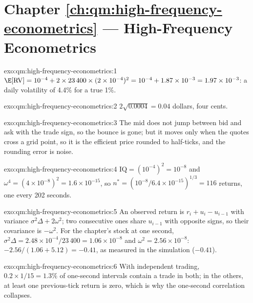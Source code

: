 \section*{Chapter \ref{ch:qm:high-frequency-econometrics} --- High-Frequency Econometrics}

\begin{solution}{exo:qm:high-frequency-econometrics:1}
$\E[\mathrm{RV}] = 10^{-4} + 2 \times 23\,400 \times (2 \times 10^{-4})^2 = 10^{-4} + 1.87 \times 10^{-3} = 1.97 \times 10^{-3}$: a daily volatility of 4.4\% for a true 1\%.
\end{solution}

\begin{solution}{exo:qm:high-frequency-econometrics:2}
$2\sqrt{0.0004} = 0.04$ dollars, four cents.
\end{solution}

\begin{solution}{exo:qm:high-frequency-econometrics:3}
The mid does not jump between bid and ask with the trade sign, so the bounce is gone; but it moves only when the quotes cross a grid point, so it is the efficient price
rounded to half-ticks, and the rounding error is noise.
\end{solution}

\begin{solution}{exo:qm:high-frequency-econometrics:4}
$\mathrm{IQ} = (10^{-4})^2 = 10^{-8}$ and $\omega^4 = (4 \times 10^{-8})^2 = 1.6 \times 10^{-15}$, so $n^* = (10^{-8}/6.4 \times 10^{-15})^{1/3} = 116$ returns, one every 202 seconds.
\end{solution}

\begin{solution}{exo:qm:high-frequency-econometrics:5}
An observed return is $r_i + u_i - u_{i-1}$ with variance $\sigma^2\Delta + 2\omega^2$; two consecutive ones share $u_{i-1}$ with opposite signs, so their covariance is
$-\omega^2$. For the chapter's stock at one second, $\sigma^2\Delta = 2.48 \times 10^{-4}/23\,400 = 1.06 \times 10^{-8}$ and $\omega^2 = 2.56 \times 10^{-8}$: $-2.56/(1.06 + 5.12) =
-0.41$, as measured in the simulation ($-0.41$).
\end{solution}

\begin{solution}{exo:qm:high-frequency-econometrics:6}
With independent trading, $0.2 \times 1/15 = 1.3\%$ of one-second intervals contain a trade in both; in the others, at least one previous-tick return is zero, which is why the
one-second correlation collapses.
\end{solution}

